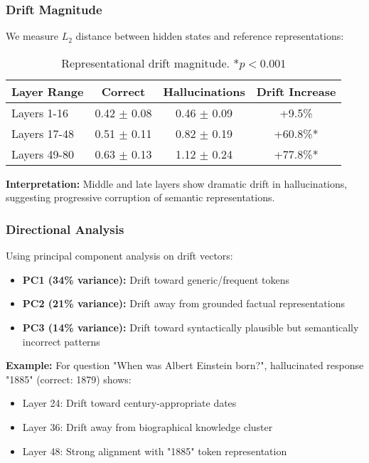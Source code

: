 \documentclass[11pt]{article}
\begin{document}
\subsubsection{Drift Magnitude}

We measure $L_2$ distance between hidden states and reference representations:

\begin{table}[H]
\centering
\begin{tabular}{@{}lccc@{}}
\toprule
\textbf{Layer Range} & \textbf{Correct} & \textbf{Hallucinations} & \textbf{Drift Increase} \\ \midrule
Layers 1-16 & 0.42 $\pm$ 0.08 & 0.46 $\pm$ 0.09 & +9.5\% \\
Layers 17-48 & 0.51 $\pm$ 0.11 & 0.82 $\pm$ 0.19 & +60.8\%* \\
Layers 49-80 & 0.63 $\pm$ 0.13 & 1.12 $\pm$ 0.24 & +77.8\%* \\ \bottomrule
\end{tabular}
\caption{Representational drift magnitude. *$p < 0.001$}
\end{table}

\textbf{Interpretation:} Middle and late layers show dramatic drift in hallucinations, suggesting progressive corruption of semantic representations.

\subsubsection{Directional Analysis}

Using principal component analysis on drift vectors:

\begin{itemize}
    \item \textbf{PC1 (34\% variance):} Drift toward generic/frequent tokens
    \item \textbf{PC2 (21\% variance):} Drift away from grounded factual representations
    \item \textbf{PC3 (14\% variance):} Drift toward syntactically plausible but semantically incorrect patterns
\end{itemize}

\textbf{Example:} For question "When was Albert Einstein born?", hallucinated response "1885" (correct: 1879) shows:
\begin{itemize}
    \item Layer 24: Drift toward century-appropriate dates
    \item Layer 36: Drift away from biographical knowledge cluster
    \item Layer 48: Strong alignment with "1885" token representation
\end{itemize}
\end{document}

